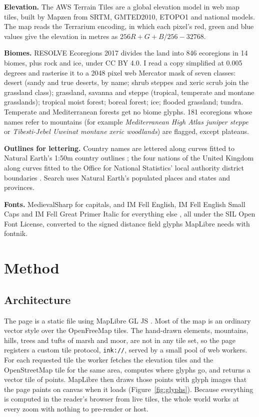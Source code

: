 \documentclass[11pt,a4paper]{article}
\begin{document}
\textbf{Elevation.} The AWS Terrain Tiles \citep{terrain} are a global elevation model in web map tiles, built by Mapzen from SRTM, GMTED2010, ETOPO1 and national models. The map reads the Terrarium encoding, in which each pixel's red, green and blue values give the elevation in metres as $256R + G + B/256 - 32768$.

\textbf{Biomes.} RESOLVE Ecoregions 2017 \citep{resolve} divides the land into 846 ecoregions in 14 biomes, plus rock and ice, under CC BY 4.0. I read a copy simplified at 0.005 degrees and rasterise it to a 2048 pixel web Mercator mask of seven classes: desert (sandy and true deserts, by name; shrub steppes and xeric scrub join the grassland class); grassland, savanna and steppe (tropical, temperate and montane grasslands); tropical moist forest; boreal forest; ice; flooded grassland; tundra. Temperate and Mediterranean forests get no biome glyphs. 181 ecoregions whose names refer to mountains (for example \emph{Mediterranean High Atlas juniper steppe} or \emph{Tibesti-Jebel Uweinat montane xeric woodlands}) are flagged, except plateaus.

\textbf{Outlines for lettering.} Country names are lettered along curves fitted to Natural Earth's 1:50m country outlines \citep{naturalearth}; the four nations of the United Kingdom along curves fitted to the Office for National Statistics' local authority district boundaries \citep{ons}. Search uses Natural Earth's populated places and states and provinces.

\textbf{Fonts.} MedievalSharp for capitals, and IM Fell English, IM Fell English Small Caps and IM Fell Great Primer Italic for everything else \citep{fonts}, all under the SIL Open Font License, converted to the signed distance field glyphs MapLibre needs with fontnik.

\section{Method}
\subsection{Architecture}
The page is a static file using MapLibre GL JS \citep{maplibre}. Most of the map is an ordinary vector style over the OpenFreeMap tiles. The hand-drawn elements, mountains, hills, trees and tufts of marsh and moor, are not in any tile set, so the page registers a custom tile protocol, \texttt{ink://}, served by a small pool of web workers. For each requested tile the worker fetches the elevation tiles and the OpenStreetMap tile for the same area, computes where glyphs go, and returns a vector tile of points. MapLibre then draws those points with glyph images that the page paints on canvas when it loads (Figure~\ref{fig:glyphs}). Because everything is computed in the reader's browser from live tiles, the whole world works at every zoom with nothing to pre-render or host.
\end{document}

